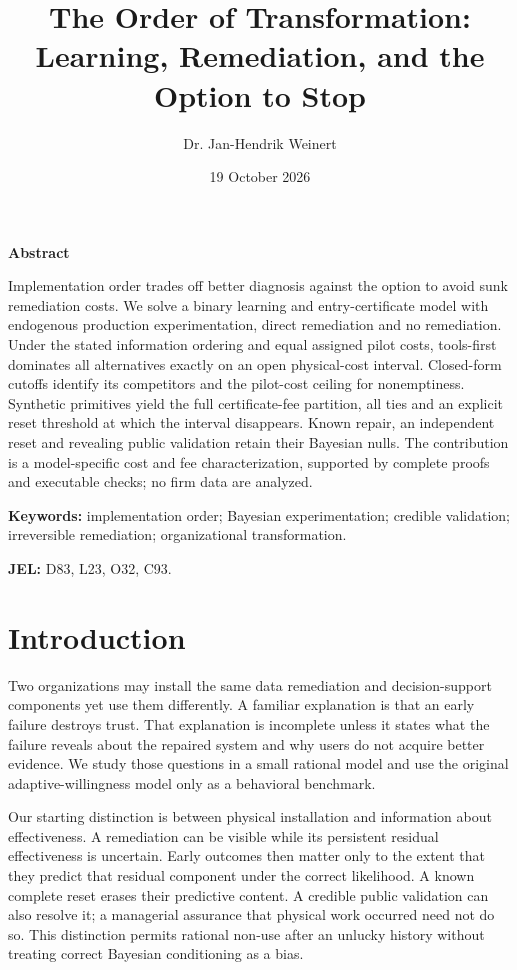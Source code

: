 \documentclass[11pt]{article}
\title{The Order of Transformation:\\Learning, Remediation, and the Option to Stop}
\author{Dr. Jan-Hendrik Weinert}
\date{19 October 2026}
\makeatletter
\renewcommand{\maketitle}{%
  \begin{center}
  {\LARGE\bfseries\@title\par}
  \vspace{0.8em}
  {\normalsize\@author\par}
  \vspace{0.35em}
  {\small\@date\par}
  \end{center}
  \vspace{0.4em}}
\renewenvironment{abstract}{%
  \begin{center}\small\bfseries Abstract\end{center}
  \begin{list}{}{\setlength{\leftmargin}{0.5in}\setlength{\rightmargin}{0.5in}}
  \item[]\small\setlength{\parindent}{0pt}\ignorespaces
}{\end{list}\vspace{0.6em}}
\makeatother
\begin{document}
\maketitle
\begin{abstract}
Implementation order trades off better diagnosis against the option to avoid sunk remediation costs. We solve a binary learning and entry-certificate model with endogenous production experimentation, direct remediation and no remediation. Under the stated information ordering and equal assigned pilot costs, tools-first dominates all alternatives exactly on an open physical-cost interval. Closed-form cutoffs identify its competitors and the pilot-cost ceiling for nonemptiness. Synthetic primitives yield the full certificate-fee partition, all ties and an explicit reset threshold at which the interval disappears. Known repair, an independent reset and revealing public validation retain their Bayesian nulls. The contribution is a model-specific cost and fee characterization, supported by complete proofs and executable checks; no firm data are analyzed.
\end{abstract}
\noindent\small \noindent\textbf{Keywords:} implementation order; Bayesian experimentation; credible validation; irreversible remediation; organizational transformation.
\par \textbf{JEL:} D83, L23, O32, C93.\par\normalsize
\vspace{0.6em}
\section{Introduction}
Two organizations may install the same data remediation and decision-support components yet use them differently. A familiar explanation is that an early failure destroys trust. That explanation is incomplete unless it states what the failure reveals about the repaired system and why users do not acquire better evidence. We study those questions in a small rational model and use the original adaptive-willingness model only as a behavioral benchmark.

Our starting distinction is between physical installation and information about effectiveness. A remediation can be visible while its persistent residual effectiveness is uncertain. Early outcomes then matter only to the extent that they predict that residual component under the correct likelihood. A known complete reset erases their predictive content. A credible public validation can also resolve it; a managerial assurance that physical work occurred need not do so. This distinction permits rational non-use after an unlucky history without treating correct Bayesian conditioning as a bias.
\end{document}
